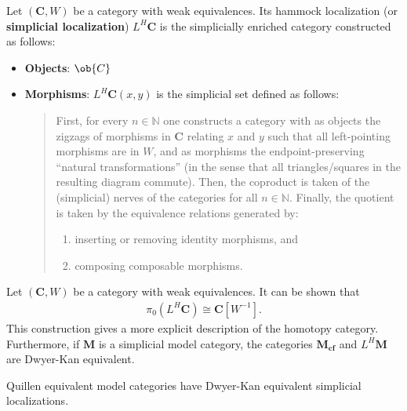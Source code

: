     \begin{construct}
        Let $(\mathbf{C},W)$ be a category with weak equivalences. Its hammock localization (or \textbf{simplicial localization}) $L^H\mathbf{C}$ is the simplicially enriched category constructed as follows:
        \begin{itemize}
            \item\textbf{Objects}: $\ob{C}$
            \item\textbf{Morphisms}: $L^H\mathbf{C}(x,y)$ is the simplicial set defined as follows:
            \begin{quote}
                First, for every $n\in\mathbb{N}$ one constructs a category with as objects the zigzags of morphisms in $\mathbf{C}$ relating $x$ and $y$ such that all left-pointing morphisms are in $W$, and as morphisms the endpoint-preserving ``natural transformations'' (in the sense that all triangles/squares in the resulting diagram commute). Then, the coproduct is taken of the (simplicial) nerves of the categories for all $n\in\mathbb{N}$. Finally, the quotient is taken by the equivalence relations generated by:
                \begin{enumerate}
                    \item inserting or removing identity morphisms, and
                    \item composing composable morphisms.
                \end{enumerate}
            \end{quote}
        \end{itemize}
    \end{construct}

    \begin{property}
        Let $(\mathbf{C},W)$ be a category with weak equivalences. It can be shown that
        \begin{gather}
            \pi_0(L^H\mathbf{C})\cong\mathbf{C}[W^{-1}].
        \end{gather}
        This construction gives a more explicit description of the homotopy category. Furthermore, if $\mathbf{M}$ is a simplicial model category, the categories $\mathbf{M_{cf}}$ and $L^H\mathbf{M}$ are Dwyer-Kan equivalent.
    \end{property}
    \begin{property}
        Quillen equivalent model categories have Dwyer-Kan equivalent simplicial localizations.
    \end{property}

